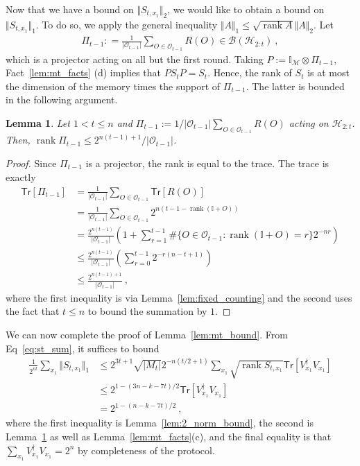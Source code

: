 \documentclass[11pt]{article}
\newtheorem{lemma}[theorem]{Lemma}
\newcommand{\id}{\ensuremath{\mathbb{I}}}
\newcommand{\Tr}{\mathsf{Tr}}
\newcommand{\Oc}{\mathcal{O}}
\DeclareMathOperator{\rank}{rank}
\newcommand{\Hc}{\mathcal{H}}
\newcommand{\Mc}{\mathcal{M}}
\begin{document}
Now that we have a bound on $\Vert S_{t,x_1}\Vert_2$, we would like to obtain a bound on $\Vert S_{t,x_1}\Vert_1$. To do so, we apply the general inequality $\Vert A\Vert_1 \leq \sqrt{\rank A} \Vert A\Vert_2$. Let
\begin{align}
    \Pi_{t-1} : = \frac{1}{\vert \Oc_{t-1}\vert }\sum_{O \in \Oc_{t-1}}R(O) \in \mathcal{B}(\Hc_{2:t}) \ ,
\end{align}
which is a projector acting on all but the first round. Taking $P:= \id_{\Mc} \otimes \Pi_{t-1}$, Fact~\ref{lem:mt_facts} (d) implies that $PS_t P = S_t$. Hence, the rank of $S_t$ is at most the dimension of the memory times the support of $\Pi_{t-1}$. The latter is bounded in the following argument.

\begin{lemma}\label{lem:projection_rank}
    Let $1< t \leq n$ and $\Pi_{t-1} := 1/\vert \Oc_{t-1}\vert \sum_{O \in \Oc_{t-1}}R(O)$ acting on $\Hc_{2:t}$. Then, $\rank \Pi_{t-1} \leq 2^{n(t-1)+1}/\vert  \Oc_{t-1}\vert$.
\end{lemma}
\begin{proof}
    Since $\Pi_{t-1}$ is a projector, the rank is equal to the trace. The trace is exactly
    \begin{align}
        \Tr[\Pi_{t-1}]& = \frac{1}{\vert \Oc_{t-1}\vert}\sum_{O \in \Oc_{t-1}}\Tr[R(O)]\\
        & = \frac{1}{\vert \Oc_{t-1}\vert} \sum_{O \in \Oc_{t-1}}2^{n(t-1 - \rank(\id + O))}\\
        & = \frac{2^{n(t-1)}}{\vert \Oc_{t-1}\vert} \left(1 + \sum_{r=1}^{t-1}\#\{O\in\Oc_{t-1}: \rank(\id+O) = r\}  2^{-nr}\right) \\
        & \leq \frac{2^{n(t-1)}}{\vert \Oc_{t-1}\vert}\left( \sum_{r=0}^{t-1} 2^{-r(n-t+1)}\right) \\
        & \leq \frac{2^{n(t-1)+1}}{\vert \Oc_{t-1}\vert}\ ,
    \end{align}
    where the first inequality is via Lemma~\ref{lem:fixed_counting} and the second uses the fact that $t \leq n$ to bound the summation by $1$.
\end{proof}

We can now complete the proof of Lemma~\ref{lem:mt_bound}. From Eq~\eqref{eq:st_sum}, it suffices to bound
\begin{align}
    \frac{1}{2^{nt}}\sum_{x_1} \Vert S_{t,x_1}\Vert_1 & \leq 2^{3t+1}\sqrt{\vert M_t\vert }2^{-n(t/2+1)}\sum_{x_1 }\sqrt{\rank S_{t,x_1}}\Tr[V_{x_1}^\dagger V_{x_1}]\\
    & \leq 2^{1-(3n-k-7t)/2}\Tr[V_{x_1}^\dagger V_{x_1}]\\
    & = 2^{1-(n-k-7t)/2}\ ,
\end{align}
where the first inequality is Lemma~\ref{lem:2_norm_bound}, the second is Lemma~\ref{lem:projection_rank} as well as Lemma~\ref{lem:mt_facts}(c), and the final equality is that $\sum_{x_1}V_{x_1}^\dagger V_{x_1} = 2^{n}$ by completeness of the protocol.
\end{document}
